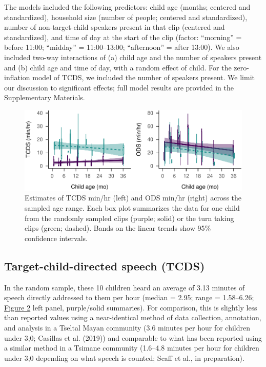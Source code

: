 \documentclass[,man,floatsintext]{apa6}
\begin{document}
The models included the following predictors: child age (months;
centered and standardized), household size (number of people; centered
and standardized), number of non-target-child speakers present in that
clip (centered and standardized), and time of day at the start of the
clip (factor: \enquote{morning} = before 11:00; \enquote{midday} =
11:00--13:00; \enquote{afternoon} = after 13:00). We also included
two-way interactions of (a) child age and the number of speakers present
and (b) child age and time of day, with a random effect of child. For
the zero-inflation model of TCDS, we included the number of speakers
present. We limit our discussion to significant effects; full model
results are provided in the Supplementary Materials.

\begin{figure}
\centering
\includegraphics{Yeli-CLE_files/figure-latex/fig2-1.pdf}
\caption{\label{fig:fig2}Estimates of TCDS min/hr (left) and ODS min/hr
(right) across the sampled age range. Each box plot summarizes the data
for one child from the randomly sampled clips (purple; solid) or the
turn taking clips (green; dashed). Bands on the linear trends show 95\%
confidence intervals.}
\end{figure}

\subsection{Target-child-directed speech
(TCDS)}\label{target-child-directed-speech-tcds}

In the random sample, these 10 children heard an average of 3.13 minutes
of speech directly addressed to them per hour (median = 2.95; range =
1.58--6.26; \protect\hyperlink{fig2}{Figure 2} left panel, purple/solid
summaries). For comparison, this is slightly less than reported values
using a near-identical method of data collection, annotation, and
analysis in a Tseltal Mayan community (3.6 minutes per hour for children
under 3;0; Casillas et al. (2019)) and comparable to what has been
reported using a similar method in a Tsimane community (1.6--4.8 minutes
per hour for children under 3;0 depending on what speech is counted;
Scaff et al., in preparation).
\end{document}
